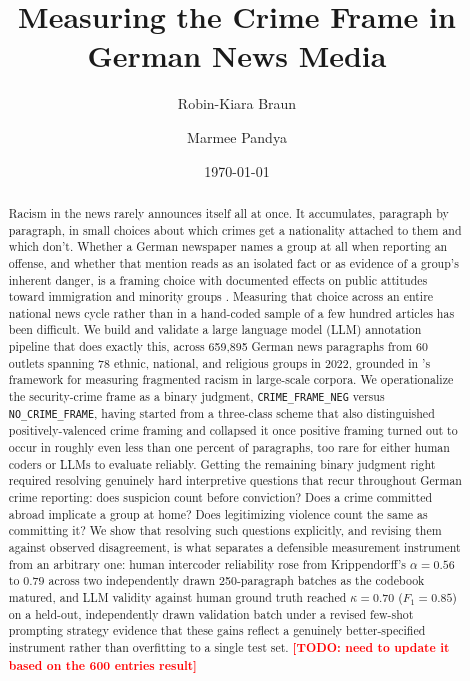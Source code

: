 \documentclass[a4paper,oneside,bibliography=totoc]{scrartcl}
\newcommand{\todo}[1]{\textcolor{red}{\textbf{[TODO: #1]}}}
\begin{document}
\subject{Computational Analysis of Communication}
\title{Measuring the Crime Frame in German News Media}
\author{Robin-Kiara Braun \and Marmee Pandya}
\date{\today}
\maketitle

\begin{abstract}
Racism in the news rarely announces itself all at once. It accumulates, paragraph by paragraph, in small choices about which crimes get a nationality attached to them and which don't. Whether a German newspaper names a group at all when reporting an offense, and whether that mention reads as an isolated fact or as evidence of a group's inherent danger, is a framing choice with documented effects on public attitudes toward immigration and minority groups \citep{devreese2011,guo2023,lecheler2015}. Measuring that choice across an entire national news cycle rather than in a hand-coded sample of a few hundred articles has been difficult. We build and validate a large language model (LLM) annotation pipeline that does exactly this, across 659{,}895 German news paragraphs from 60 outlets spanning 78 ethnic, national, and religious groups in 2022, grounded in \citet{freudenthaler2025}'s framework for measuring fragmented racism in large-scale corpora. We operationalize the security-crime frame as a binary judgment, \texttt{CRIME\_FRAME\_NEG} versus \texttt{NO\_CRIME\_FRAME}, having started from a three-class scheme that also distinguished positively-valenced crime framing and collapsed it once positive framing turned out to occur in roughly even less than one percent of paragraphs, too rare for either human coders or LLMs to evaluate reliably. Getting the remaining binary judgment right required resolving genuinely hard interpretive questions that recur throughout German crime reporting: does suspicion count before conviction? Does a crime committed abroad implicate a group at home? Does legitimizing violence count the same as committing it? We show that resolving such questions explicitly, and revising them against observed disagreement, is what separates a defensible measurement instrument from an arbitrary one: human intercoder reliability rose from Krippendorff's $\alpha = 0.56$ to $0.79$ across two independently drawn 250-paragraph batches as the codebook matured, and LLM validity against human ground truth reached $\kappa = 0.70$ ($F_1 = 0.85$) on a held-out, independently drawn validation batch under a revised few-shot prompting strategy evidence that these gains reflect a genuinely better-specified instrument rather than overfitting to a single test set. \todo{need to update it based on the 600 entries result}
\end{abstract}
\end{document}
